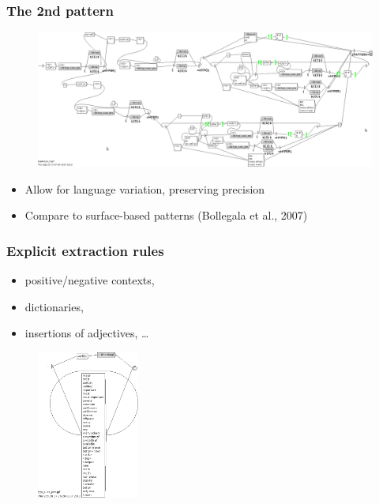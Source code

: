 \documentclass{beamer}
\begin{document}
\begin{frame}
\frametitle{The 2nd pattern}

\begin{figure}	
	\centering
		\includegraphics[width=1.0\textwidth]{figures/pattern2}
	\end{figure}

\begin{itemize}
  \item Allow for language variation, preserving precision
	  \item Compare to surface-based patterns (Bollegala et al., 2007)
	
\end{itemize}

\end{frame}


\begin{frame}
\frametitle{Explicit extraction rules}

\begin{itemize}
	  \item positive/negative contexts,
	  \item dictionaries,	
	  \item insertions of adjectives, \ldots
\end{itemize}

\begin{figure}	
	\centering
		\includegraphics[width=0.3\textwidth]{figures/cues}
	\end{figure}


\end{frame}
\end{document}
